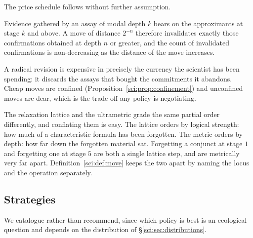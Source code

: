 The price schedule follows without further assumption.

\begin{proposition}
\label{sci:prop:movecost}
Evidence gathered by an assay of modal depth $k$ bears on the approximants at stage $k$ and above. A
move of distance $2^{-n}$ therefore invalidates exactly those confirmations obtained at depth $n$ or
greater, and the count of invalidated confirmations is non-decreasing as the distance of the move
increases.
\end{proposition}

A radical revision is expensive in precisely the currency the scientist has been spending: it discards
the assays that bought the commitments it abandons. Cheap moves are confined
(Proposition~\ref{sci:prop:confinement}) and unconfined moves are dear, which is the trade-off any policy
is negotiating.

\begin{remark}
\label{sci:rem:twogradings}
The relaxation lattice and the ultrametric grade the same partial order differently, and conflating
them is easy. The lattice orders by logical strength: how much of a characteristic formula has been
forgotten. The metric orders by depth: how far down the forgotten material sat. Forgetting a conjunct
at stage $1$ and forgetting one at stage $5$ are both a single lattice step, and are metrically very
far apart. Definition~\ref{sci:def:move} keeps the two apart by naming the locus and the operation
separately.
\end{remark}

\subsection{Strategies}\label{sci:S6.3}

We catalogue rather than recommend, since which policy is best is an ecological question and depends on
the distribution of \S\ref{sci:sec:distributions}.

